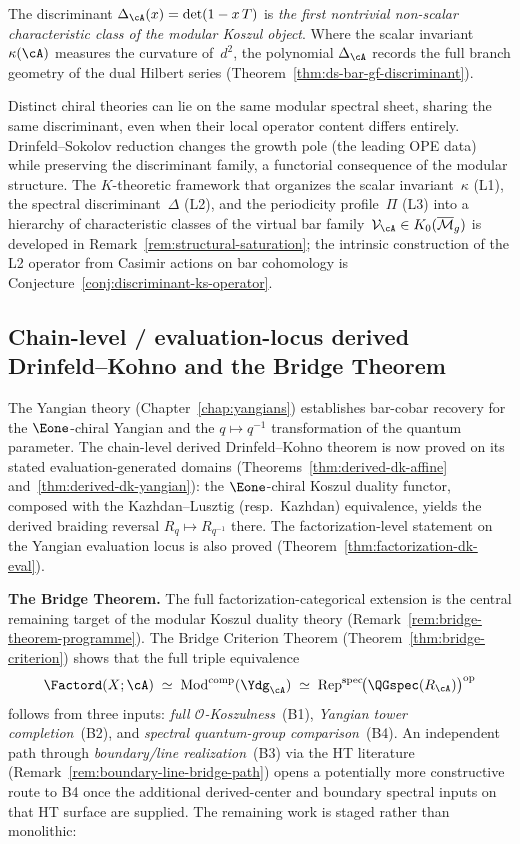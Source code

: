 The discriminant $\Delta_{\cA}(x) = \det(1 - x\,T)$ is
\emph{the first nontrivial non-scalar characteristic class
of the modular Koszul object}. Where the scalar invariant
$\kappa(\cA)$ measures the curvature of~$d^2$, the polynomial
$\Delta_{\cA}$ records the full branch geometry of the dual
Hilbert series (Theorem~\ref{thm:ds-bar-gf-discriminant}).

Distinct chiral theories can lie on the same modular spectral
sheet, sharing the same discriminant, even when their local
operator content differs entirely. Drinfeld--Sokolov reduction
changes the growth pole (the leading OPE data) while preserving
the discriminant family, a functorial consequence of the
modular structure.
The $K$-theoretic framework that organizes the scalar
invariant~$\kappa$ (L1), the spectral discriminant~$\Delta$ (L2),
and the periodicity profile~$\Pi$ (L3) into a hierarchy of
characteristic classes of the virtual bar
family~$\mathcal{V}_{\cA} \in K_0(\overline{\mathcal{M}}_g)$
is developed in Remark~\ref{rem:structural-saturation}; the
intrinsic construction of the L2 operator from Casimir actions
on bar cohomology is Conjecture~\ref{conj:discriminant-ks-operator}.

\subsection{Chain-level / evaluation-locus derived Drinfeld--Kohno and the Bridge Theorem}

The Yangian theory (Chapter~\ref{chap:yangians}) establishes bar-cobar
recovery for the $\Eone$-chiral Yangian and the $q \mapsto q^{-1}$
transformation of the quantum parameter. The chain-level derived
Drinfeld--Kohno theorem is now proved on its stated
evaluation-generated domains
\textup{(}Theorems~\ref{thm:derived-dk-affine}
and~\ref{thm:derived-dk-yangian}\textup{)}: the $\Eone$-chiral Koszul
duality functor, composed with the Kazhdan--Lusztig (resp.\ Kazhdan)
equivalence, yields the derived braiding reversal
$R_q \mapsto R_{q^{-1}}$ there. The factorization-level statement on
the Yangian evaluation locus is also proved
\textup{(}Theorem~\ref{thm:factorization-dk-eval}\textup{)}.

\medskip\noindent
\textbf{The Bridge Theorem.}
The full factorization-categorical extension is the central remaining
target of the modular Koszul duality theory
(Remark~\ref{rem:bridge-theorem-programme}).
The Bridge Criterion Theorem
(Theorem~\ref{thm:bridge-criterion}) shows that the
full triple equivalence
\[
\Factord(X;\cA)
\;\simeq\;
\operatorname{Mod}^{\mathrm{comp}}(\Ydg_{\cA})
\;\simeq\;
\operatorname{Rep}^{\mathrm{spec}}\!
 \bigl(\QGspec(R_{\cA})\bigr)^{\mathrm{op}}
\]
follows from three inputs:
\emph{full $\mathcal{O}$-Koszulness}~(B1),
\emph{Yangian tower completion}~(B2), and
\emph{spectral quantum-group comparison}~(B4).
An independent path through \emph{boundary/line realization}~(B3)
via the HT literature
(Remark~\ref{rem:boundary-line-bridge-path})
opens a potentially more constructive route to B4 once the additional
derived-center and boundary spectral inputs on that HT surface are supplied.
The remaining work is staged rather than monolithic:

